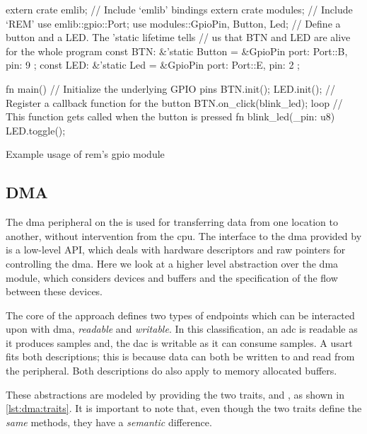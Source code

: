 \begin{listing}[H]
  \begin{rustcode}
extern crate emlib;    // Include `emlib' bindings
extern crate modules;  // Include `REM'
use emlib::gpio::Port;
use modules::{GpioPin, Button, Led};
// Define a button and a LED. The 'static lifetime tells
// us that BTN and LED are alive for the whole program
const BTN: &'static Button = &GpioPin { port: Port::B, pin: 9 };
const LED: &'static Led    = &GpioPin { port: Port::E, pin: 2 };

fn main() {
  // Initialize the underlying GPIO pins
  BTN.init();
  LED.init();
  // Register a callback function for the button
  BTN.on_click(blink_led);
  loop {}
}
// This function gets called when the button is pressed
fn blink_led(_pin: u8) {
  LED.toggle();
}
  \end{rustcode}
  \caption{Example usage of \gls{rem}'s \gls{gpio} module}
  \label{lst:gpio_abstraction}
\end{listing}

\subsection{DMA}

The \gls{dma} peripheral on the {\gecko} is used for transferring data from one location to another, without intervention from the \gls{cpu}.
The interface to the \gls{dma} provided by {\emlib} is a low-level API, which deals with hardware descriptors and raw pointers for controlling the \gls{dma}.
Here we look at a higher level abstraction over the \gls{dma} module, which considers devices and buffers and the specification of the flow between these devices.

The core of the approach defines two types of endpoints which can be interacted upon with \gls{dma}, \emph{readable} and \emph{writable}.
In this classification, an \gls{adc} is readable as it produces samples and, the \gls{dac} is writable as it can consume samples.
A \gls{usart} fits both descriptions; this is because data can both be written to and read from the peripheral.
Both descriptions do also apply to memory allocated buffers.

These abstractions are modeled by providing the two traits,  and , as shown in \autoref{lst:dma:traits}.
It is important to note that, even though the two traits define the \emph{same} methods, they have a \emph{semantic} difference.


